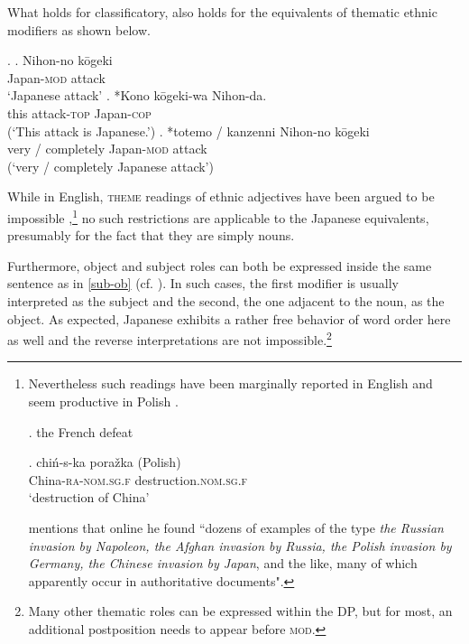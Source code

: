 What holds for classificatory, also holds for the equivalents of thematic ethnic modifiers as shown below.

\ex. \ag. Nihon-no kōgeki\\
Japan-\textsc{mod} attack\\
`Japanese attack'
\bg. *Kono kōgeki-wa Nihon-da.\\
this attack-\textsc{top} Japan-\textsc{cop}\\
(`This attack is Japanese.’)
\cg. *totemo / kanzenni Nihon-no kōgeki\\
very / completely Japan-\textsc{mod} attack\\
(`very / completely Japanese attack’)

While in  English, \textsc{theme} readings of ethnic adjectives have been argued to be impossible \citep{kayne:1981:ecp, giorgi:1991:syntax},\footnote{Nevertheless such readings have been marginally reported in English \citep{arseni:2014:EA} and seem productive in Polish \citep{cetnarowska:2015:categorial}.

\par

\ex. the French defeat \null\hfill \citep[23]{arseni:2014:EA}

\exg. chiń-s-ka pora\v{z}ka (Polish)\\
China-\textsc{ra-nom.sg.f} destruction.\textsc{nom.sg.f}\\
`destruction of China' \null\hfill \citep[136]{cetnarowska:2015:categorial}

\par


\citet[20]{rainer:2013:can} mentions that online he found ``dozens of examples of the type \textit{the Russian invasion by Napoleon, the Afghan invasion by Russia, the Polish invasion by Germany, the Chinese invasion by Japan}, and the like, many of which apparently occur in authoritative documents".} no such restrictions are applicable to the Japanese equivalents, presumably for the fact that they are simply nouns. 

\largerpage[2]
Furthermore, object and subject roles can both be expressed inside the same sentence as in \ref{sub-ob} (cf. \citealt{murasugi:1991:noun}). In such cases, the first modifier is usually interpreted as the subject and the second, the one adjacent to the noun, as the object. As expected, Japanese exhibits a rather free behavior of word order here as well and the reverse interpretations are not impossible.\footnote{Many other thematic roles can be expressed within the DP, but for most, an additional postposition needs to appear before \textsc{mod}.}


